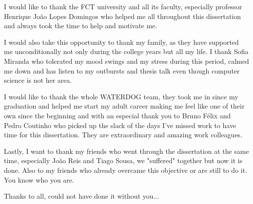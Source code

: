 \acknowledgements

I would like to thank the FCT university and all its faculty, especially professor Henrique João Lopes Domingos who helped me all throughout this dissertation and always took the time to help and motivate me. 

I would also take this opportunity to thank my family, as they have supported me unconditionally not only during the college years but all my life. I thank Sofia Miranda who tolerated my mood swings and my stress during this period, calmed me down and has listen to my outbursts and thesis talk even though computer science is not her area.

I would like to thank the whole WATERDOG team, they took me in since my graduation and helped me start my adult career making me feel like one of their own since the beginning and with an  especial thank you to Bruno Félix and Pedro Coutinho who picked up the slack of the days I've missed work to have time for this dissertation. They are extraordinary and amazing work colleagues.

Lastly, I want to thank my friends who went through the dissertation at the same time, especially João Reis and Tiago Sousa, we "suffered" together but now it is done. Also to my friends who already overcame this objective or are still to do it. You know who you are.

\vspace{20mm}

Thanks to all, could not have done it without you...